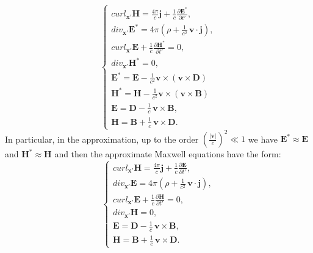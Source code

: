 \documentclass{article}
\theoremstyle{definition}
\theoremstyle{remark}
\renewcommand{\vec}[1]{\mathbf{#1}}
\newcommand{\R}{\mathbb{R}}
\newcommand{\R}{{\mathbb{R}}}
\begin{document}
\begin{equation}\label{MaxMedFullGGffgguiuiouiogghghhgghhjhjhjjgghhgKK}
\begin{cases}
curl_{\vec x'}\vec H= \frac{4\pi}{c}\vec j+
\frac{1}{c}\frac{\partial \vec E^*}{\partial
t'},\\
div_{\vec x'}\vec E^*= 4\pi\left(\rho+\frac{1}{c^2}\,\vec v\cdot\vec j\right),\\
curl_{\vec x'}\vec E+\frac{1}{c}\frac{\partial\vec H^*}{\partial
t'}=0,\\
div_{\vec x'}\vec H^*=0,\\
\vec E^*=\vec E-\frac{1}{c^2}\vec v\times\left(\vec v\times\vec
D\right)
\\
\vec H^*=\vec H-\frac{1}{c^2}\vec v\times\left(\vec v\times\vec
B\right)\\
\vec E=\vec D-\frac{1}{c}\,\vec v\times \vec B,\\
\vec H=\vec B+\frac{1}{c}\,\vec v\times \vec D.
\end{cases}
\end{equation}
In particular, in the approximation, up to the order
$\left(\frac{|\vec v|}{c}\right)^2\ll 1$ we have $\vec
E^*\approx\vec E$ and $\vec H^*\approx\vec H$ and then the
approximate Maxwell equations have the form:
\begin{equation}\label{MaxMedFullGGffgguiuiouiogghghhgghhjhjhjjgghhgjhgghhhjkiljklKK}
\begin{cases}
curl_{\vec x'}\vec H= \frac{4\pi}{c}\vec j+
\frac{1}{c}\frac{\partial \vec E}{\partial
t'},\\
div_{\vec x'}\vec E= 4\pi\left(\rho+\frac{1}{c^2}\,\vec v\cdot\vec j\right),\\
curl_{\vec x'}\vec E+\frac{1}{c}\frac{\partial\vec H}{\partial
t'}=0,\\
div_{\vec x'}\vec H=0,\\
\vec E=\vec D-\frac{1}{c}\,\vec v\times \vec B,\\
\vec H=\vec B+\frac{1}{c}\,\vec v\times \vec D.
\end{cases}
\end{equation}
\end{document}
